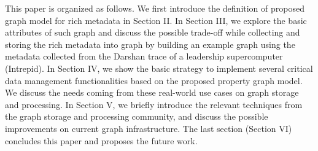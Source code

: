 This paper is organized as follows. We first introduce the definition of proposed graph model for rich metadata in Section II. In Section III, we explore the basic attributes of such graph and discuss the possible trade-off while collecting and storing the rich metadata into graph by building an example graph using the metadata collected from the Darshan trace of a leadership supercomputer (Intrepid). In Section IV, we show the basic strategy to implement several critical data management functionalities based on the proposed property graph model. We discuss the needs coming from these real-world use cases on graph storage and processing. In Section V, we briefly introduce the relevant techniques from the graph storage and processing community, and discuss the possible improvements on current graph infrastructure. The last section (Section VI) concludes this paper and proposes the future work.